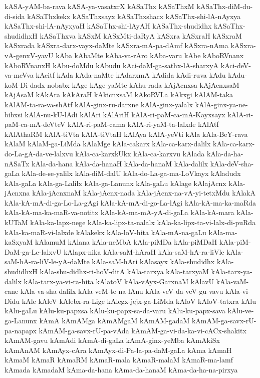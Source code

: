 {kASA-yAM-ba-rava
kASA-ya-vasatxrX
kASaThx
kASaThxM
kASaThx-diM-du-di-sida
kASaThxkekx
kASaThxsayx
kASaThxshacx
kASaThx-shi-lA-nAyxya
kASaThx-shi-lA-nAyxyaH
kASaThx-shi-lAyAH
kASaThx-shudidhx
kASaThx-shudidhxH
kASaThxva
kASxM
kASxMti-daRyA
kASxra
kASxraH
kASxraM
kASxrada
kASxra-darx-vayx-daMte
kASxra-mA-pa-dAmf
kASxra-nAma
kASxra-vA-genxV-yavU
kAba
kAbaMte
kAba-va-rAro
kAba-varu
kAbe
kAboRVnanx
kAboRVnanxH
kAbu-doMdu
kAbudu
kAci-daM-ga-sathx-lA-sharxyA
kAci-deV-va-meVva
kAcitf
kAda
kAda-naMte
kAdarxmA
kAdida
kAdi-ruva
kAdu
kAdu-koM-Di-dadx-nobabx
kAge
kAge-yaMte
kAhu-rada
kAjAcnxsa
kAjAcnxsaM
kAjAsaM
kAkAra
kAkAraH
kAkicnxsaM
kAkoRVLa
kAkxgi
kAlAM-taka
kAlAM-ta-ra-va-shAtf
kAlA-ginx-ru-darxne
kAlA-ginx-yalalx
kAlA-ginx-ya-ne-bibxsi
kAlA-nu-kU-lAdi
kAlAri
kAlAriH
kAlA-ri-paM-ca-mA-Kayxsayx
kAlA-ri-paM-ca-mA-deVteV
kAlA-ri-paM-cama
kAlA-ri-yaM-ta-lalxde
kAlAtf
kAlAthaRM
kAlA-tiVta
kAlA-tiVtaH
kAlAya
kAlA-yeVti
kAla
kAla-BeY-rava
kAlaM
kAlaM-ga-LiMda
kAlaMge
kAla-cakarx
kAla-ca-karx-dalilx
kAla-ca-karx-do-La-gA-da-ve-lalxvu
kAla-ca-karxkUkx
kAla-ca-karxvu
kAlada
kAla-da-ha-nASaTx
kAla-da-hana
kAla-da-hanaH
kAla-da-hanaM
kAla-dalilx
kAla-deV-sha-gaLa
kAla-de-se-yalilx
kAla-diM-dalU
kAla-do-La-ga-ma-LoVkayx
kAladudx
kAla-gaLa
kAla-ga-Lalilx
kAla-ga-Lanunx
kAla-gaLu
kAlage
kAlajAcnx
kAla-jAcnxna
kAla-jAcnxnaM
kAla-jAcnx-nada
kAla-jAcnx-na-vA-yi-tetxMdu
kAlakA
kAla-kA-mA-di-ga-Lo-La-gAgi
kAla-kA-mA-di-go-La-lAgi
kAla-kA-ma-ka-maRda
kAla-kA-ma-ka-maR-va-notitx
kAla-kA-ma-mA-yA-di-gaLa
kAla-kA-mara
kAla-kUTaM
kAla-ka-lapx-nege
kAla-ka-lipx-ta-nalalx
kAla-ka-lipx-ta-vi-lalx-di-puRda
kAla-ka-maR-vi-lalxde
kAlakekx
kAla-loV-hita
kAla-mA-na-gaLu
kAla-ma-kaSxyaM
kAlamuM
kAlana
kAla-neMbA
kAla-piMDa
kAla-piMDaH
kAla-piM-DaM-ga-Le-lalxvU
kAlapx-nika
kAla-saM-hAraH
kAla-saM-hA-ra-liVle
kAla-saM-hA-ra-liV-le-yA-daMte
kAla-saM-hAri
kAlasayx
kAla-shudidhx
kAla-shudidhxH
kAla-shu-didhx-ri-hoV-ditA
kAla-tarxya
kAla-tarxyaM
kAla-tarx-ya-dalilx
kAla-tarx-ya-vi-ra-hita
kAlatoV
kAla-vAyx-GarxnaM
kAlavU
kAla-vaM-cane
kAla-va-sha-dalilx
kAla-veM-te-na-lAnu
kAla-veV-da-veV-gu-vavu
kAla-vi-Didu
kAle
kAleV
kAlebx-ra-Lige
kAlegx-jejx-ga-LiMda
kAloV
kAloV-tatxra
kAlu
kAlu-gaLu
kAlu-ku-papxsa
kAlu-ku-papx-sa-da-varu
kAlu-ku-papx-sava
kAlu-ve-ga-Lanunx
kAmA
kAmAMga
kAmAMgaM
kAmAM-gadaM
kAmAM-ga-savx-rU-pa-napapx
kAmAM-ga-savx-rU-pa-vAda
kAmAM-ga-vi-da-ka-vi-cACx-shakitx
kAmAM-gavu
kAmAdi
kAmA-di-gaLa
kAmA-ginx-yeMba
kAmAkiSx
kAmAnAM
kAmAyx-cAra
kAmAyx-di-Pa-la-pa-daM-gaLa
kAma
kAmaH
kAmaM
kAmaR
kAmaRM
kAmaR-mala
kAmaR-malaM
kAmaR-ma-lamf
kAmada
kAmadaM
kAma-da-hana
kAma-da-hanaM
kAma-da-ha-na-pirxya
}
